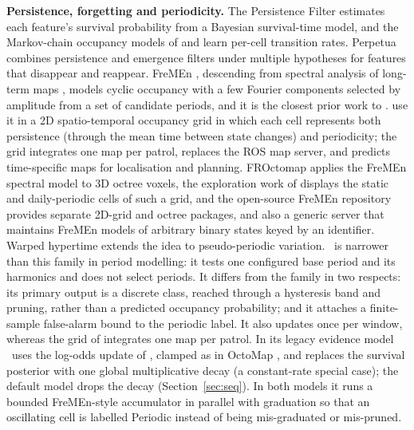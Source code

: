 \noindent\textbf{Persistence, forgetting and periodicity.} The Persistence Filter \citep{rosen2016persistence} estimates each feature's survival probability from a Bayesian survival-time model, and the Markov-chain occupancy models of \citet{tipaldi2013lifelong} and \citet{saarinen2012imac} learn per-cell transition rates. Perpetua \citep{saavedraruiz2025perpetua} combines persistence and emergence filters under multiple hypotheses for features that disappear and reappear. FreMEn \citep{krajnik2017fremen}, descending from spectral analysis of long-term maps \citep{krajnik2014spectral}, models cyclic occupancy with a few Fourier components selected by amplitude from a set of candidate periods, and it is the closest prior work to \sname. \citet{krajnik2016persistent} use it in a 2D spatio-temporal occupancy grid in which each cell represents both persistence (through the mean time between state changes) and periodicity; the grid integrates one map per patrol, replaces the ROS map server, and predicts time-specific maps for localisation and planning. FROctomap \citep{krajnik2014froctomap} applies the FreMEn spectral model to 3D octree voxels, the exploration work of \citet{krajnik2015exploration} displays the static and daily-periodic cells of such a grid, and the open-source FreMEn repository \citep{fremenrepo} provides separate 2D-grid and octree packages, and also a generic server that maintains FreMEn models of arbitrary binary states keyed by an identifier. Warped hypertime \citep{krajnik2019warped} extends the idea to pseudo-periodic variation. \sname\ is narrower than this family in period modelling: it tests one configured base period and its harmonics and does not select periods. It differs from the family in two respects: its primary output is a discrete class, reached through a hysteresis band and pruning, rather than a predicted occupancy probability; and it attaches a finite-sample false-alarm bound to the periodic label. It also updates once per window, whereas the grid of \citet{krajnik2016persistent} integrates one map per patrol. In its legacy evidence model \sname\ uses the log-odds update of \citet{thrun2005probabilistic}, clamped as in OctoMap \citep{hornung2013octomap}, and replaces the survival posterior with one global multiplicative decay (a constant-rate special case); the default model drops the decay (Section~\ref{sec:seq}). In both models it runs a bounded FreMEn-style accumulator in parallel with graduation so that an oscillating cell is labelled Periodic instead of being mis-graduated or mis-pruned.


